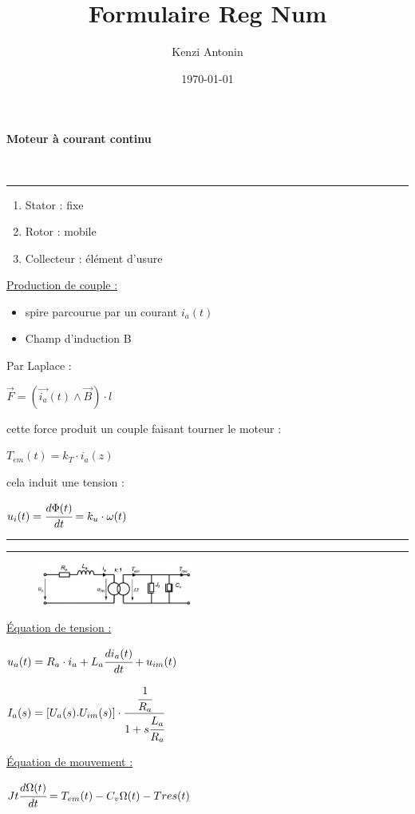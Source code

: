 \documentclass[	DIV=calc,%
							paper=a4,%
							fontsize=10pt,%
							twocolumn]{scrartcl} %
\title{Formulaire Reg Num} %
\author{Kenzi Antonin}	%
\date{\vspace{-30pt} \today} %
\newcommand{\hformbar}[1]{\bigskip \hrule \vspace{1pt} \hrule \vspace{5pt}} %
\newcommand{\initial}[1]{%
     \lettrine[lines=3,lhang=0.3,nindent=0em]{
     				\color{DarkGoldenrod}
     				{\textsf{#1}}}{}}
\newcounter{mycounter}
\newcommand{\formdesc}[1]{\large\textbf{#1} \addtocounter{mycounter}{1} \hfill \themycounter \\ \vspace{-3mm} \hrule \vspace{2mm}}
\newcommand{\formtitle}[1]{\large\underline{#1}}
\begin{document}
\maketitle
\thispagestyle{fancy} 	%

\formdesc{Moteur à courant continu}
\begin{enumerate}
    \item Stator : fixe
    \item Rotor : mobile
    \item Collecteur : élément d'usure 
\end{enumerate}

\formtitle{Production de couple :}
\begin{itemize}
    \item spire parcourue par un courant $i_a(t)$
    \item Champ d'induction B 
\end{itemize}
Par Laplace :

{\hfill $\vec{F} = (\vec{i_a}(t) \wedge  \vec{B})\cdot l$\hfill}

cette force produit un couple faisant tourner le moteur : 

{\hfill $T_{em}(t) = k_T \cdot i_a(z)$\hfill}

cela induit une tension :

{\hfill $u_i(t) = \cfrac{d \Phi(t)}{dt}=k_u \cdot \omega(t)$\hfill}

\hformbar

\formdesc{Équations du moteur Dc et de la charge}

{ \vspace{-3mm}
    \begin{figure}[H]
        \includegraphics[width=0.45\textwidth]{img/equation_mot.JPG}
    \end{figure}
}
\formtitle{Équation de tension : }

{\hfill $u_a(t) = R_a \cdot i_a + L_a \cfrac{di_a(t)}{dt}+u_{im}(t)$\hfill}

{\hfill $I_a(s) = [U_a(s).U_{im}(s)] \cdot \cfrac{ \cfrac{1}{R_a}}{1+s\cfrac{L_a}{R_a}}  $\hfill}


\formtitle{Équation de mouvement :} 

{\hfill $Jt \cfrac{d\Omega(t)}{dt} = T_{em}(t) - C_v \Omega(t) - Tres(t) $\hfill}
\end{document}
